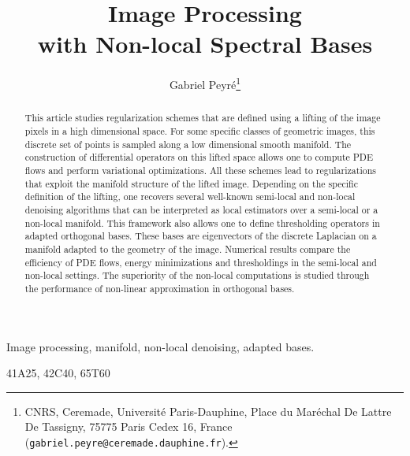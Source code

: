 \documentclass[final]{siamltex}
\begin{document}
\title{Image Processing\\with Non-local Spectral Bases}



\author{Gabriel Peyr\'e\thanks{CNRS, Ceremade, Universit\'e Paris-Dauphine,
		Place du Mar\'echal De Lattre De Tassigny, 75775 Paris Cedex 16, France
		({\tt gabriel.peyre@ceremade.dauphine.fr}).} %
        }


\maketitle



\begin{abstract}
	This article studies regularization schemes that are defined using a lifting of the image pixels in a high dimensional space. For some specific classes of geometric images, this discrete set of points is sampled along a low dimensional smooth manifold. The construction of differential operators on this lifted space allows one to compute PDE flows and perform variational optimizations. All these schemes lead to regularizations that exploit the manifold structure of the lifted image. Depending on the specific definition of the lifting, one recovers several well-known semi-local and non-local denoising algorithms that can be interpreted as local estimators over a semi-local or a non-local manifold. This framework also allows one to define thresholding operators in adapted orthogonal bases. These bases are eigenvectors of the discrete Laplacian on a manifold adapted to the geometry of the image. Numerical results compare the efficiency of PDE flows, energy minimizations and thresholdings in the semi-local and non-local settings. The superiority of the non-local computations is studied through the performance of non-linear approximation in orthogonal bases.
\end{abstract}

\begin{keywords} 
Image processing, manifold, non-local denoising, adapted bases.
\end{keywords}

\begin{AMS}
41A25, 42C40, 65T60
\end{AMS}


\pagestyle{myheadings}
\thispagestyle{plain}
\end{document}
